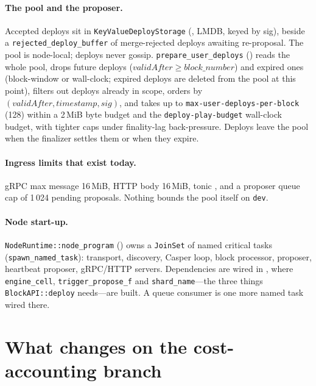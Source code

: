 \documentclass[11pt]{article}
\newcommand{\code}[1]{\texttt{#1}}
\newcommand{\dev}{\code{dev}}
\begin{document}
\paragraph{The pool and the proposer.} Accepted deploys sit in
\code{KeyValueDeployStorage} (, LMDB, keyed by
sig), beside a \code{rejected\_deploy\_buffer} of merge-rejected deploys awaiting
re-proposal. The pool is node-local; deploys never gossip.
\code{prepare\_user\_deploys} ()
reads the whole pool, drops future deploys ($\mathit{validAfter} \ge
\mathit{block\_number}$) and expired ones (block-window or wall-clock; expired deploys
are deleted from the pool at this point), filters out deploys already in scope,
orders by $(\mathit{validAfter}, \mathit{timestamp}, \mathit{sig})$, and takes up to
\code{max-user-deploys-per-block} (128) within a 2\,MiB byte budget and the
\code{deploy-play-budget} wall-clock budget, with tighter caps under finality-lag
back-pressure. Deploys leave the pool when the finalizer settles them or when they
expire.

\paragraph{Ingress limits that exist today.} gRPC max message 16\,MiB, HTTP body
16\,MiB, tonic , and a proposer queue
cap of 1\,024 pending proposals. Nothing bounds the pool itself on \dev.

\paragraph{Node start-up.} \code{NodeRuntime::node\_program}
() owns a \code{JoinSet} of named
critical tasks (\code{spawn\_named\_task}): transport, discovery, Casper loop, block
processor, proposer, heartbeat proposer, gRPC/HTTP servers. Dependencies are wired in
, where
\code{engine\_cell}, \code{trigger\_propose\_f} and \code{shard\_name}---the three
things \code{BlockAPI::deploy} needs---are built. A queue consumer is one more named
task wired there.

\section{What changes on the cost-accounting branch}
\label{sec:branch}
\end{document}
